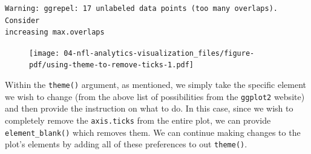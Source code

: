 \documentclass[
  letterpaper,
]{krantz}
\begin{document}
\begin{verbatim}
Warning: ggrepel: 17 unlabeled data points (too many overlaps). Consider
increasing max.overlaps
\end{verbatim}

\begin{figure}[H]

{\centering \texttt{[image: 04-nfl-analytics-visualization\_files/figure-pdf/using-theme-to-remove-ticks-1.pdf]}

}

\end{figure}

Within the \texttt{theme()} argument, as mentioned, we simply take the
specific element we wish to change (from the above list of possibilities
from the \texttt{ggplot2} website) and then provide the instruction on
what to do. In this case, since we wish to completely remove the
\texttt{axis.ticks} from the entire plot, we can provide
\texttt{element\_blank()} which removes them. We can continue making
changes to the plot's elements by adding all of these preferences to out
\texttt{theme()}.
\end{document}
